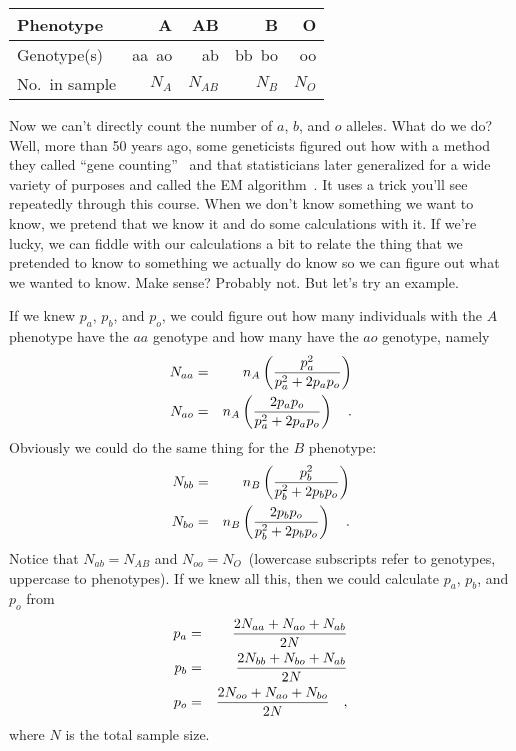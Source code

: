 \begin{center}
\begin{tabular}{l|r|r|r|r}
\hline\hline
Phenotype      & A      & AB       & B       & O  \\
\hline
Genotype(s)    & aa\ ao & ab       & bb\ bo  & oo \\
No.\ in sample & $N_A$  & $N_{AB}$ & $N_{B}$ & $N_O$ \\
\hline
\end{tabular}
\end{center}
Now we can't directly count the number of $a$, $b$, and $o$
alleles. What do we do? Well, more than 50 years ago, some geneticists
figured out how with a method they called ``gene
counting''~\cite{Ceppellini-etal-1955} and that statisticians later
generalized for a wide variety of purposes and called the EM
algorithm~\cite{Dempster-etal-1977}. It uses a trick you'll see
repeatedly through this course. When we don't know something we want
to know, we pretend that we know it and do some calculations with
it. If we're lucky, we can fiddle with our calculations a bit to
relate the thing that we pretended to know to something we actually do
know so we can figure out what we wanted to know. Make sense? Probably
not. But let's try an example.

If we knew $p_a$, $p_b$, and $p_o$, we could figure out how many
individuals with the $A$ phenotype have the $aa$ genotype and how many
have the $ao$ genotype, namely
\begin{eqnarray*}
N_{aa} &=& n_A \left({p_a^2 \over p_a^2 + 2p_ap_o}\right) \\
N_{ao} &=& n_A \left({2p_ap_o \over p_a^2 + 2p_ap_o}\right) \quad .
\end{eqnarray*}
Obviously we could do the same thing for the $B$ phenotype:
\begin{eqnarray*}
N_{bb} &=& n_B \left({p_b^2 \over p_b^2 + 2p_bp_o}\right) \\
N_{bo} &=& n_B \left({2p_bp_o \over p_b^2 + 2p_bp_o}\right) \quad .
\end{eqnarray*}
Notice that $N_{ab} = N_{AB}$ and $N_{oo} = N_O$~(lowercase
subscripts refer to genotypes, uppercase to phenotypes). If we knew
all this, then we could calculate $p_a$, $p_b$, and $p_o$ from
\begin{eqnarray*}
p_a &=& {2N_{aa} + N_{ao} + N_{ab} \over 2N} \\
p_b &=& {2N_{bb} + N_{bo} + N_{ab} \over 2N} \\
p_o &=& {2N_{oo} + N_{ao} + N_{bo} \over 2N} \quad ,
\end{eqnarray*}
where $N$ is the total sample size.

